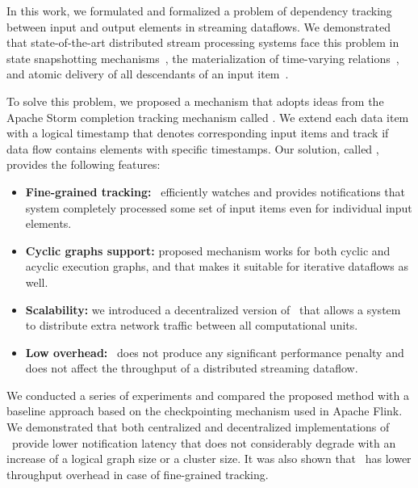 \label {fs-acker-conclusion}

In this work, we formulated and formalized a problem of dependency tracking between input and output elements in streaming dataflows. We demonstrated that state-of-the-art distributed stream processing systems face this problem in state snapshotting mechanisms~\cite{Carbone:2017:SMA:3137765.3137777, apache:storm}, the materialization of time-varying relations~\cite{Begoli:2019:OSR:3299869.3314040}, and atomic delivery of all descendants of an input item~\cite{we2018adbis}.  

To solve this problem, we proposed a mechanism that adopts ideas from the Apache Storm completion tracking mechanism called \acker. We extend each data item with a logical timestamp that denotes corresponding input items and track if data flow contains elements with specific timestamps. Our solution, called \tracker, provides the following features:
\begin{itemize}
    \item {\bf Fine-grained tracking:} \tracker\ efficiently watches and provides notifications that system completely processed some set of input items even for individual input elements.
    \item {\bf Cyclic graphs support:} proposed mechanism works for both cyclic and acyclic execution graphs, and that makes it suitable for iterative dataflows as well. 
    \item {\bf Scalability:} we introduced a decentralized version of \tracker\ that allows a system to distribute extra network traffic between all computational units. 
    \item {\bf Low overhead:} \tracker\ does not produce any significant performance penalty and does not affect the throughput of a distributed streaming dataflow.
\end{itemize}

We conducted a series of experiments and compared the proposed method with a baseline approach based on the checkpointing mechanism used in Apache Flink. We demonstrated that both centralized and decentralized implementations of \tracker\ provide lower notification latency that does not considerably degrade with an increase of a logical graph size or a cluster size. It was also shown that \tracker\ has lower throughput overhead in case of fine-grained tracking.